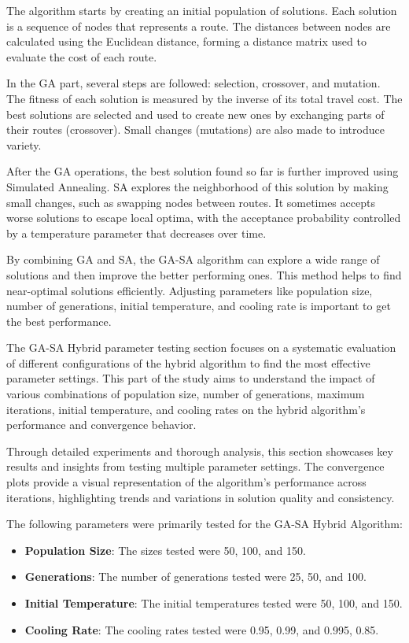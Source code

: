 \documentclass{article}
\begin{document}
    The algorithm starts by creating an initial population of solutions. Each solution is a sequence of nodes that represents a route. The distances between nodes are calculated using the Euclidean distance, forming a distance matrix used to evaluate the cost of each route.

    In the GA part, several steps are followed: selection, crossover, and mutation. The fitness of each solution is measured by the inverse of its total travel cost. The best solutions are selected and used to create new ones by exchanging parts of their routes (crossover). Small changes (mutations) are also made to introduce variety.

    After the GA operations, the best solution found so far is further improved using Simulated Annealing. SA explores the neighborhood of this solution by making small changes, such as swapping nodes between routes. It sometimes accepts worse solutions to escape local optima, with the acceptance probability controlled by a temperature parameter that decreases over time.

    By combining GA and SA, the GA-SA algorithm can explore a wide range of solutions and then improve the better performing ones. This method helps to find near-optimal solutions efficiently. Adjusting parameters like population size, number of generations, initial temperature, and cooling rate is important to get the best performance.


    The GA-SA Hybrid parameter testing section focuses on a systematic evaluation of different configurations of the hybrid algorithm to find the most effective parameter settings. This part of the study aims to understand the impact of various combinations of population size, number of generations, maximum iterations, initial temperature, and cooling rates on the hybrid algorithm's performance and convergence behavior.

    Through detailed experiments and thorough analysis, this section showcases key results and insights from testing multiple parameter settings. The convergence plots provide a visual representation of the algorithm's performance across iterations, highlighting trends and variations in solution quality and consistency.


    The following parameters were primarily tested for the GA-SA Hybrid Algorithm:

    \begin{itemize}
        \item \textbf{Population Size}: The sizes tested were 50, 100, and 150.
        \item \textbf{Generations}: The number of generations tested were 25, 50, and 100.
        \item \textbf{Initial Temperature}: The initial temperatures tested were 50, 100, and 150.
        \item \textbf{Cooling Rate}: The cooling rates tested were 0.95, 0.99, and 0.995, 0.85.
    \end{itemize}
\end{document}
